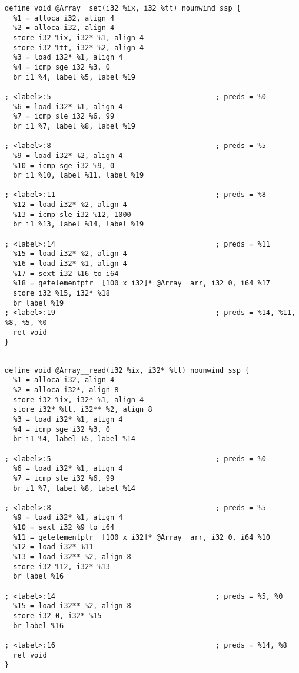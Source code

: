 \documentclass[10pt,a4paper]{article}
\begin{document}
{\begin{verbatim}
define void @Array__set(i32 %ix, i32 %tt) nounwind ssp {
  %1 = alloca i32, align 4
  %2 = alloca i32, align 4
  store i32 %ix, i32* %1, align 4
  store i32 %tt, i32* %2, align 4
  %3 = load i32* %1, align 4
  %4 = icmp sge i32 %3, 0
  br i1 %4, label %5, label %19

; <label>:5                                       ; preds = %0
  %6 = load i32* %1, align 4
  %7 = icmp sle i32 %6, 99
  br i1 %7, label %8, label %19

; <label>:8                                       ; preds = %5
  %9 = load i32* %2, align 4
  %10 = icmp sge i32 %9, 0
  br i1 %10, label %11, label %19

; <label>:11                                      ; preds = %8
  %12 = load i32* %2, align 4
  %13 = icmp sle i32 %12, 1000
  br i1 %13, label %14, label %19

; <label>:14                                      ; preds = %11
  %15 = load i32* %2, align 4
  %16 = load i32* %1, align 4
  %17 = sext i32 %16 to i64
  %18 = getelementptr  [100 x i32]* @Array__arr, i32 0, i64 %17
  store i32 %15, i32* %18
  br label %19
; <label>:19                                      ; preds = %14, %11, %8, %5, %0
  ret void
}
\end{verbatim}


\begin{verbatim}

define void @Array__read(i32 %ix, i32* %tt) nounwind ssp {
  %1 = alloca i32, align 4
  %2 = alloca i32*, align 8
  store i32 %ix, i32* %1, align 4
  store i32* %tt, i32** %2, align 8
  %3 = load i32* %1, align 4
  %4 = icmp sge i32 %3, 0
  br i1 %4, label %5, label %14

; <label>:5                                       ; preds = %0
  %6 = load i32* %1, align 4
  %7 = icmp sle i32 %6, 99
  br i1 %7, label %8, label %14

; <label>:8                                       ; preds = %5
  %9 = load i32* %1, align 4
  %10 = sext i32 %9 to i64
  %11 = getelementptr  [100 x i32]* @Array__arr, i32 0, i64 %10
  %12 = load i32* %11
  %13 = load i32** %2, align 8
  store i32 %12, i32* %13
  br label %16

; <label>:14                                      ; preds = %5, %0
  %15 = load i32** %2, align 8
  store i32 0, i32* %15
  br label %16

; <label>:16                                      ; preds = %14, %8
  ret void
}
\end{verbatim}


}
\end{document}
